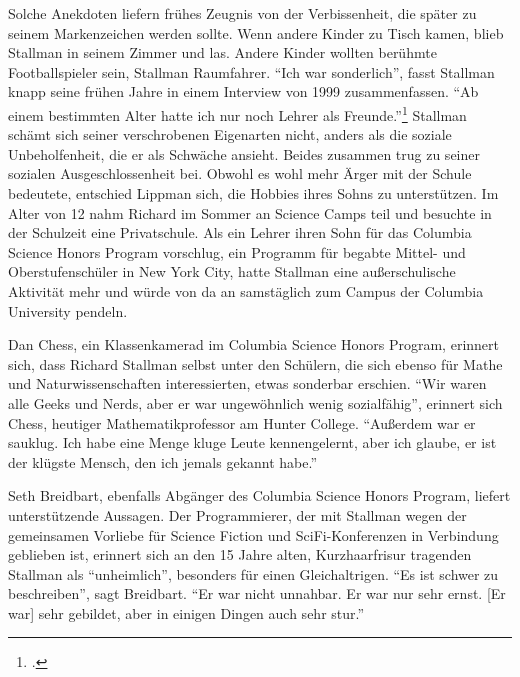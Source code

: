 Solche Anekdoten liefern frühes Zeugnis von der Verbissenheit, die später zu seinem Markenzeichen werden sollte. Wenn andere Kinder zu Tisch kamen, blieb Stallman in seinem Zimmer und las. Andere Kinder wollten berühmte Footballspieler sein, Stallman Raumfahrer. "`Ich war sonderlich"', fasst Stallman knapp seine frühen Jahre in einem Interview von 1999 zusammenfassen. "`Ab einem bestimmten Alter hatte ich nur noch Lehrer als Freunde."'\footcite{rmshsm} Stallman schämt sich seiner verschrobenen Eigenarten nicht, anders als die soziale Unbeholfenheit, die er als Schwäche ansieht. Beides zusammen trug zu seiner sozialen Ausgeschlossenheit bei.
Obwohl es wohl mehr Ärger mit der Schule bedeutete, entschied Lippman sich, die Hobbies ihres Sohns zu unterstützen. Im Alter von 12 nahm Richard im Sommer an Science Camps teil und besuchte in der Schulzeit eine Privatschule. Als ein Lehrer ihren Sohn für das Columbia Science Honors Program vorschlug, ein Programm für begabte Mittel- und Oberstufenschüler in New York City, hatte Stallman eine außerschulische Aktivität mehr und würde von da an samstäglich zum Campus der Columbia University pendeln.

Dan Chess, ein Klassenkamerad im Columbia Science Honors Program, erinnert sich, dass Richard Stallman selbst unter den Schülern, die sich ebenso für Mathe und Naturwissenschaften interessierten, etwas sonderbar erschien. "`Wir waren alle Geeks und Nerds, aber er war ungewöhnlich wenig sozialfähig"', erinnert sich Chess, heutiger Mathematikprofessor am Hunter College. "`Außerdem war er sauklug. Ich habe eine Menge kluge Leute kennengelernt, aber ich glaube, er ist der klügste Mensch, den ich jemals gekannt habe."'

Seth Breidbart, ebenfalls Abgänger des Columbia Science Honors Program, liefert unterstützende Aussagen. Der Programmierer, der mit Stallman wegen der gemeinsamen Vorliebe für Science Fiction und SciFi-Konferenzen in Verbindung geblieben ist, erinnert sich an den 15 Jahre alten, Kurzhaarfrisur tragenden Stallman als "`unheimlich"', besonders für einen Gleichaltrigen.
"`Es ist schwer zu beschreiben"', sagt Breidbart. "`Er war nicht unnahbar. Er war nur sehr ernst. [Er war] sehr gebildet, aber in einigen Dingen auch sehr stur."'

